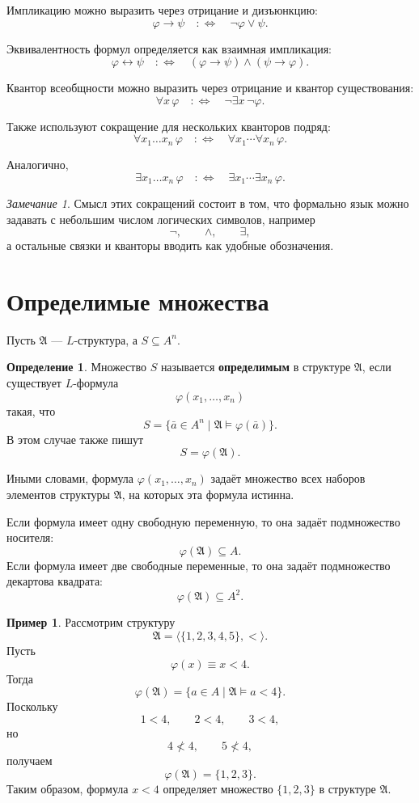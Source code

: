 \documentclass[12pt,a4paper,oneside,openany]{book}
\theoremstyle{definition}
\newtheorem{definition}{Определение}[chapter]
\newtheorem{example}{Пример}[chapter]
\theoremstyle{plain}
\theoremstyle{remark}
\newtheorem{remark}{Замечание}[chapter]
\begin{document}
Импликацию можно выразить через отрицание и дизъюнкцию:
\[
\varphi\to\psi
\quad:\Longleftrightarrow\quad
\neg\varphi\vee\psi.
\]

Эквивалентность формул определяется как взаимная импликация:
\[
\varphi\leftrightarrow\psi
\quad:\Longleftrightarrow\quad
(\varphi\to\psi)\wedge(\psi\to\varphi).
\]

Квантор всеобщности можно выразить через отрицание и квантор существования:
\[
\forall x\,\varphi
\quad:\Longleftrightarrow\quad
\neg\exists x\,\neg\varphi.
\]

Также используют сокращение для нескольких кванторов подряд:
\[
\forall x_1\ldots x_n\,\varphi
\quad:\Longleftrightarrow\quad
\forall x_1\cdots\forall x_n\,\varphi.
\]

Аналогично,
\[
\exists x_1\ldots x_n\,\varphi
\quad:\Longleftrightarrow\quad
\exists x_1\cdots\exists x_n\,\varphi.
\]

\begin{remark}
Смысл этих сокращений состоит в том, что формально язык можно задавать с небольшим числом логических символов, например
\[
\neg,\qquad \wedge,\qquad \exists,
\]
а остальные связки и кванторы вводить как удобные обозначения.
\end{remark}


\section{Определимые множества}

Пусть $\mathfrak A$ — $L$-структура, а $S\subseteq A^n$.

\begin{definition}
Множество $S$ называется \textbf{определимым} в структуре $\mathfrak A$, если существует $L$-формула
\[
\varphi(x_1,\ldots,x_n)
\]
такая, что
\[
S
=
\{\bar a\in A^n\mid \mathfrak A\models \varphi(\bar a)\}.
\]
В этом случае также пишут
\[
S=\varphi(\mathfrak A).
\]
\end{definition}

Иными словами, формула $\varphi(x_1,\ldots,x_n)$ задаёт множество всех наборов элементов структуры $\mathfrak A$, на которых эта формула истинна.

Если формула имеет одну свободную переменную, то она задаёт подмножество носителя:
\[
\varphi(\mathfrak A)\subseteq A.
\]
Если формула имеет две свободные переменные, то она задаёт подмножество декартова квадрата:
\[
\varphi(\mathfrak A)\subseteq A^2.
\]

\begin{example}
Рассмотрим структуру
\[
\mathfrak A=\langle \{1,2,3,4,5\},<\rangle.
\]
Пусть
\[
\varphi(x)\equiv x<4.
\]
Тогда
\[
\varphi(\mathfrak A)
=
\{a\in A\mid \mathfrak A\models a<4\}.
\]
Поскольку
\[
1<4,\qquad 2<4,\qquad 3<4,
\]
но
\[
4\not<4,\qquad 5\not<4,
\]
получаем
\[
\varphi(\mathfrak A)=\{1,2,3\}.
\]
Таким образом, формула $x<4$ определяет множество $\{1,2,3\}$ в структуре $\mathfrak A$.
\end{example}
\end{document}
